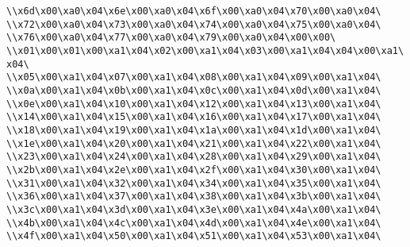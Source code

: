 \verb|\\x6d\x00\xa0\x04\x6e\x00\xa0\x04\x6f\x00\xa0\x04\x70\x00\xa0\x04\|\newline
\verb|\\x72\x00\xa0\x04\x73\x00\xa0\x04\x74\x00\xa0\x04\x75\x00\xa0\x04\|\newline
\verb|\\x76\x00\xa0\x04\x77\x00\xa0\x04\x79\x00\xa0\x04\x00\x00\|\newline
\verb|\\x01\x00\x01\x00\xa1\x04\x02\x00\xa1\x04\x03\x00\xa1\x04\x04\x00\xa1\x04\|\newline
\verb|\\x05\x00\xa1\x04\x07\x00\xa1\x04\x08\x00\xa1\x04\x09\x00\xa1\x04\|\newline
\verb|\\x0a\x00\xa1\x04\x0b\x00\xa1\x04\x0c\x00\xa1\x04\x0d\x00\xa1\x04\|\newline
\verb|\\x0e\x00\xa1\x04\x10\x00\xa1\x04\x12\x00\xa1\x04\x13\x00\xa1\x04\|\newline
\verb|\\x14\x00\xa1\x04\x15\x00\xa1\x04\x16\x00\xa1\x04\x17\x00\xa1\x04\|\newline
\verb|\\x18\x00\xa1\x04\x19\x00\xa1\x04\x1a\x00\xa1\x04\x1d\x00\xa1\x04\|\newline
\verb|\\x1e\x00\xa1\x04\x20\x00\xa1\x04\x21\x00\xa1\x04\x22\x00\xa1\x04\|\newline
\verb|\\x23\x00\xa1\x04\x24\x00\xa1\x04\x28\x00\xa1\x04\x29\x00\xa1\x04\|\newline
\verb|\\x2b\x00\xa1\x04\x2e\x00\xa1\x04\x2f\x00\xa1\x04\x30\x00\xa1\x04\|\newline
\verb|\\x31\x00\xa1\x04\x32\x00\xa1\x04\x34\x00\xa1\x04\x35\x00\xa1\x04\|\newline
\verb|\\x36\x00\xa1\x04\x37\x00\xa1\x04\x38\x00\xa1\x04\x3b\x00\xa1\x04\|\newline
\verb|\\x3c\x00\xa1\x04\x3d\x00\xa1\x04\x3e\x00\xa1\x04\x4a\x00\xa1\x04\|\newline
\verb|\\x4b\x00\xa1\x04\x4c\x00\xa1\x04\x4d\x00\xa1\x04\x4e\x00\xa1\x04\|\newline
\verb|\\x4f\x00\xa1\x04\x50\x00\xa1\x04\x51\x00\xa1\x04\x53\x00\xa1\x04\|\newline
